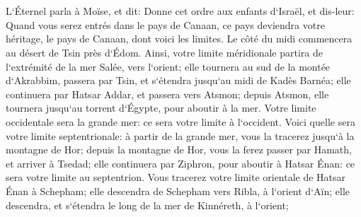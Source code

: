 \chapter{}

\verse L`Éternel parla à Moïse, et dit: 
\verse Donne cet ordre aux enfants d`Israël, et dis-leur: Quand vous serez entrés dans le pays de Canaan, ce pays deviendra votre héritage, le pays de Canaan, dont voici les limites. 
\verse Le côté du midi commencera au désert de Tsin près d`Édom. Ainsi, votre limite méridionale partira de l`extrémité de la mer Salée, vers l`orient; 
\verse elle tournera au sud de la montée d`Akrabbim, passera par Tsin, et s`étendra jusqu`au midi de Kadès Barnéa; elle continuera par Hatsar Addar, et passera vers Atsmon; 
\verse depuis Atsmon, elle tournera jusqu`au torrent d`Égypte, pour aboutir à la mer. 
\verse Votre limite occidentale sera la grande mer: ce sera votre limite à l`occident. 
\verse Voici quelle sera votre limite septentrionale: à partir de la grande mer, vous la tracerez jusqu`à la montagne de Hor; 
\verse depuis la montagne de Hor, vous la ferez passer par Hamath, et arriver à Tsedad; 
\verse elle continuera par Ziphron, pour aboutir à Hatsar Énan: ce sera votre limite au septentrion. 
\verse Vous tracerez votre limite orientale de Hatsar Énan à Schepham; 
\verse elle descendra de Schepham vers Ribla, à l`orient d`Aïn; elle descendra, et s`étendra le long de la mer de Kinnéreth, à l`orient; 
